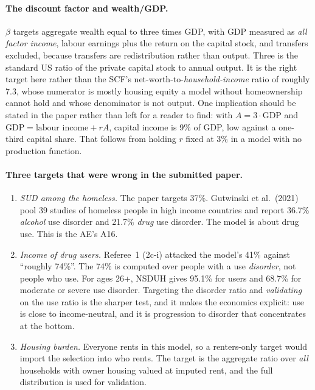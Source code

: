 \documentclass[11pt]{article}
\begin{document}
\paragraph{The discount factor and wealth/GDP.} $\beta$ targets aggregate wealth
equal to three times GDP, with GDP measured as \emph{all factor income}, labour earnings plus the return on the capital stock, and transfers excluded,
because transfers are redistribution rather than output. Three is the standard US
ratio of the private capital stock to annual output. It is the right target here
rather than the SCF's net-worth-to-\emph{household-income} ratio of roughly 7.3,
whose numerator is mostly housing equity a model without homeownership cannot
hold and whose denominator is not output. One implication should be stated in the
paper rather than left for a reader to find: with $A=3\cdot\text{GDP}$ and
$\text{GDP}=\text{labour income}+rA$, capital income is 9\% of GDP, low against a
one-third capital share. That follows from holding $r$ fixed at 3\% in a model
with no production function.

\paragraph{Three targets that were wrong in the submitted paper.}
\begin{enumerate}
\item \emph{SUD among the homeless.} The paper targets 37\%. Gutwinski et al.\
(2021) pool 39 studies of homeless people in high income countries and report
36.7\% \emph{alcohol} use disorder and 21.7\% \emph{drug} use disorder. The model
is about drug use. This is the AE's A16.

\item \emph{Income of drug users.} Referee~1 (2c-i) attacked the model's 41\%
against ``roughly 74\%''. The 74\% is computed over people with a use
\emph{disorder}, not people who use. For ages 26+, NSDUH gives 95.1\% for users
and 68.7\% for moderate or severe use disorder. Targeting the disorder ratio and
\emph{validating} on the use ratio is the sharper test, and it makes the
economics explicit: use is close to income-neutral, and it is progression to
disorder that concentrates at the bottom.

\item \emph{Housing burden.} Everyone rents in this model, so a renters-only
target would import the selection into who rents. The target is the aggregate
ratio over \emph{all} households with owner housing valued at imputed rent, and
the full distribution is used for validation.
\end{enumerate}
\end{document}
